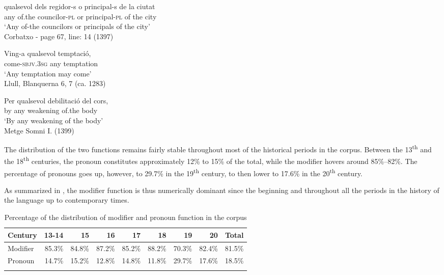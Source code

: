 \documentclass[output=paper,colorlinks,citecolor=brown]{langscibook}
\begin{document}
\ea \label{ex:ka13}
\gll qualsevol dels regidor-s o principal-s de la ciutat\\
    any of.the councilor-\textsc{pl} or principal-\textsc{pl} of the city\\
\glt ‘Any of-the councilors or principals of the city’\\
    Corbatxo - page 67, line: 14 (1397)
    
\ex \label{ex:ka14}
\gll Ving-a qualsevol temptació,\\
    come-\textsc{sbjv.3sg} any temptation\\
\glt ‘Any temptation may come’\\
    Llull, Blanquerna 6, 7 (ca. 1283)
    
\ex \label{ex:ka15}
\gll Per qualsevol debilitació del cors,\\
    by any weakening of.the body\\
\glt ‘By any weakening of the body’\\
    Metge Somni I.  (1399)
\z

The distribution of the two functions remains fairly stable throughout most of the historical periods in the corpus. Between the 13\textsuperscript{th} and the 18\textsuperscript{th} centuries, the pronoun constitutes approximately 12\% to 15\% of the total, while the modifier hovers around 85\%--82\%. The percentage of pronouns goes up, however, to 29.7\% in the 19\textsuperscript{th} century, to then lower to 17.6\% in the 20\textsuperscript{th} century.

As summarized in , the modifier function is thus numerically dominant since the beginning and throughout all the periods in the history of the language up to contemporary times.

\begin{table}
    \begin{tabularx}{\textwidth}{Xrrrrrrrr} 
    \lsptoprule
     Century & 13-14 & 15 & 16 & 17 & 18 & 19 & 20 & Total\\
     \midrule
     Modifier & 85.3\% & 84.8\%	& 87.2\% & 85.2\% & 88.2\% & 70.3\%	& 82.4\% & 81.5\% \\
     Pronoun & 14.7\% & 15.2\% & 12.8\%	& 14.8\% & 11.8\% & 29.7\% & 17.6\% & 18.5\% \\
    \lspbottomrule
    \end{tabularx}
    \caption{Percentage of the distribution of modifier and pronoun function in the corpus}
    \label{tab:ka5}
\end{table}  
\end{document}
